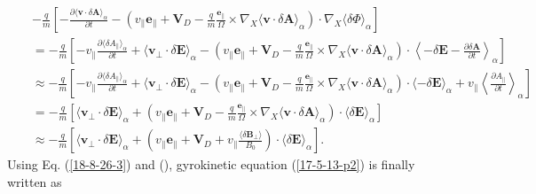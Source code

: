 \documentclass{article}
\begin{document}
\begin{eqnarray}
  &  & - \frac{q}{m} \left[ - \frac{\partial \langle \mathbf{v} \cdot \delta
  \mathbf{A} \rangle_{\alpha}}{\partial t} - \left( v_{\parallel}
  \mathbf{e}_{\parallel} +\mathbf{V}_D - \frac{q}{m} 
  \frac{\mathbf{e}_{\parallel}}{\Omega} \times \nabla_X \langle \mathbf{v}
  \cdot \delta \mathbf{A} \rangle_{\alpha} \right) \cdot \nabla_X \langle
  \delta \Phi \rangle_{\alpha} \right] \nonumber\\
  &  & = - \frac{q}{m} \left[ - v_{\parallel} \frac{\partial \langle \delta
  A_{\parallel} \rangle_{\alpha}}{\partial t} + \langle \mathbf{v}_{\perp}
  \cdot \delta \mathbf{E} \rangle_{\alpha} - \left( v_{\parallel}
  \mathbf{e}_{\parallel} +\mathbf{V}_D - \frac{q}{m} 
  \frac{\mathbf{e}_{\parallel}}{\Omega} \times \nabla_X \langle \mathbf{v}
  \cdot \delta \mathbf{A} \rangle_{\alpha} \right) \cdot \left\langle - \delta
  \mathbf{E}- \frac{\partial \delta \mathbf{A}}{\partial t}
  \right\rangle_{\alpha} \right] \nonumber\\
  &  & \approx - \frac{q}{m} \left[ - v_{\parallel} \frac{\partial \langle
  \delta A_{\parallel} \rangle_{\alpha}}{\partial t} + \langle
  \mathbf{v}_{\perp} \cdot \delta \mathbf{E} \rangle_{\alpha} - \left(
  v_{\parallel} \mathbf{e}_{\parallel} +\mathbf{V}_D - \frac{q}{m} 
  \frac{\mathbf{e}_{\parallel}}{\Omega} \times \nabla_X \langle \mathbf{v}
  \cdot \delta \mathbf{A} \rangle_{\alpha} \right) \cdot \langle - \delta
  \mathbf{E} \rangle_{\alpha} + v_{\parallel} \left\langle \frac{\partial
  A_{\parallel}}{\partial t} \right\rangle_{\alpha} \right] \nonumber\\
  &  & = - \frac{q}{m} \left[ \langle \mathbf{v}_{\perp} \cdot \delta
  \mathbf{E} \rangle_{\alpha} + \left( v_{\parallel} \mathbf{e}_{\parallel}
  +\mathbf{V}_D - \frac{q}{m}  \frac{\mathbf{e}_{\parallel}}{\Omega} \times
  \nabla_X \langle \mathbf{v} \cdot \delta \mathbf{A} \rangle_{\alpha} \right)
  \cdot \langle \delta \mathbf{E} \rangle_{\alpha} \right] \nonumber\\
  &  & \approx - \frac{q}{m} \left[ \langle \mathbf{v}_{\perp} \cdot \delta
  \mathbf{E} \rangle_{\alpha} + \left( v_{\parallel} \mathbf{e}_{\parallel}
  +\mathbf{V}_D + v_{\parallel} \frac{\langle \delta \mathbf{B}_{\perp}
  \rangle}{B_0} \right) \cdot \langle \delta \mathbf{E} \rangle_{\alpha}
  \right] .  \label{18-8-26-3}
\end{eqnarray}
Using Eq. (\ref{18-8-26-3}) and (), gyrokinetic equation (\ref{17-5-13-p2}) is
finally written as
\end{document}
